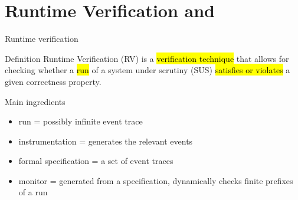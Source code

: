 \documentclass[10pt,usenames,dvipsnames]{beamer}
\begin{document}



\section{Runtime Verification and \rml}

\begin{frame}{Runtime verification}

  \begin{block}{Definition}
    Runtime Verification (RV) is a \hl{verification technique} that allows for checking whether a \hl{run} of a system under scrutiny (SUS) \hl{satisfies or violates} a given correctness property.
  \end{block}

  \begin{block}{Main ingredients}
   \begin{itemize}
   \item run = possibly infinite event trace
   \item instrumentation = generates the relevant events
   \item formal specification = a set of event traces     
   \item monitor =  generated from a specification, dynamically checks finite prefixes of a run 
\end{itemize}
  \end{block}

\end{frame}

\end{document}
